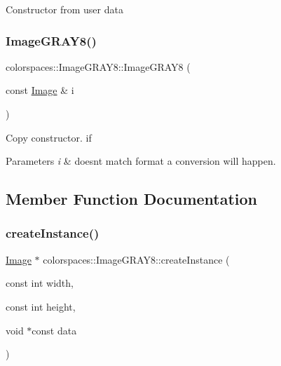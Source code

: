Constructor from user data \mbox{\label{classcolorspaces_1_1_image_g_r_a_y8_a8aad9c63c05c6d01020e09326514808f}} 
\subsubsection{\texorpdfstring{Image\+G\+R\+A\+Y8()}{ImageGRAY8()}\hspace{0.1cm}{\footnotesize\ttfamily [3/3]}}
{\footnotesize\ttfamily colorspaces\+::\+Image\+G\+R\+A\+Y8\+::\+Image\+G\+R\+A\+Y8 (\begin{DoxyParamCaption}\item[{const \hyperlink{classcolorspaces_1_1_image}{Image} \&}]{i }\end{DoxyParamCaption})}

Copy constructor. if 
\begin{DoxyParams}{Parameters}
{\em i} & doesn\textquotesingle{}t match format a conversion will happen. \\
\hline
\end{DoxyParams}


\subsection{Member Function Documentation}
\mbox{\label{classcolorspaces_1_1_image_g_r_a_y8_a3bcae629fe8c73e5a9bd2cd0e77edbfa}} 
\subsubsection{\texorpdfstring{create\+Instance()}{createInstance()}}
{\footnotesize\ttfamily \hyperlink{classcolorspaces_1_1_image}{Image} $\ast$ colorspaces\+::\+Image\+G\+R\+A\+Y8\+::create\+Instance (\begin{DoxyParamCaption}\item[{const int}]{width,  }\item[{const int}]{height,  }\item[{void $\ast$const}]{data }\end{DoxyParamCaption})\hspace{0.3cm}{\ttfamily [static]}}

